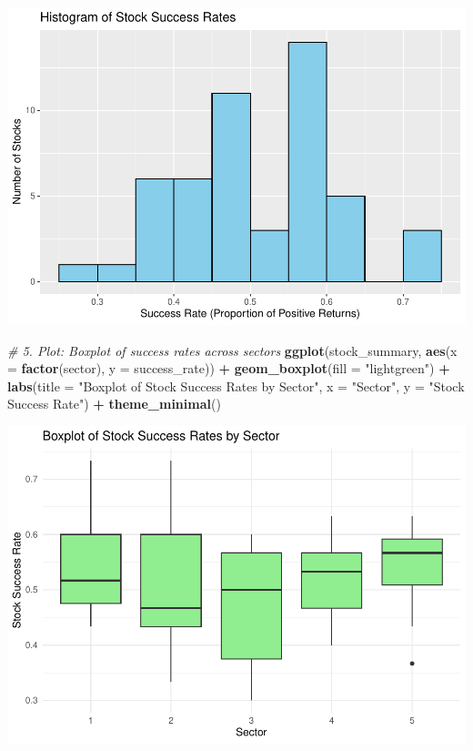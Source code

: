 \documentclass[
  11pt,
]{article}
\newenvironment{Shaded}{\begin{snugshade}}{\end{snugshade}}
\newcommand{\AttributeTok}[1]{\textcolor[rgb]{0.13,0.29,0.53}{#1}}
\newcommand{\CommentTok}[1]{\textcolor[rgb]{0.56,0.35,0.01}{\textit{#1}}}
\newcommand{\FunctionTok}[1]{\textcolor[rgb]{0.13,0.29,0.53}{\textbf{#1}}}
\newcommand{\NormalTok}[1]{#1}
\newcommand{\SpecialCharTok}[1]{\textcolor[rgb]{0.81,0.36,0.00}{\textbf{#1}}}
\newcommand{\StringTok}[1]{\textcolor[rgb]{0.31,0.60,0.02}{#1}}
\begin{document}
\includegraphics{Final-Project_files/figure-latex/appendix-code-1-1.pdf}

\begin{Shaded}
\begin{Highlighting}[]
\CommentTok{\# 5. Plot: Boxplot of success rates across sectors}
\FunctionTok{ggplot}\NormalTok{(stock\_summary, }\FunctionTok{aes}\NormalTok{(}\AttributeTok{x =} \FunctionTok{factor}\NormalTok{(sector), }\AttributeTok{y =}\NormalTok{ success\_rate)) }\SpecialCharTok{+}
  \FunctionTok{geom\_boxplot}\NormalTok{(}\AttributeTok{fill =} \StringTok{"lightgreen"}\NormalTok{) }\SpecialCharTok{+}
  \FunctionTok{labs}\NormalTok{(}\AttributeTok{title =} \StringTok{"Boxplot of Stock Success Rates by Sector"}\NormalTok{,}
       \AttributeTok{x =} \StringTok{"Sector"}\NormalTok{,}
       \AttributeTok{y =} \StringTok{"Stock Success Rate"}\NormalTok{) }\SpecialCharTok{+}
  \FunctionTok{theme\_minimal}\NormalTok{()}
\end{Highlighting}
\end{Shaded}

\includegraphics{Final-Project_files/figure-latex/appendix-code-1-2.pdf}
\end{document}

